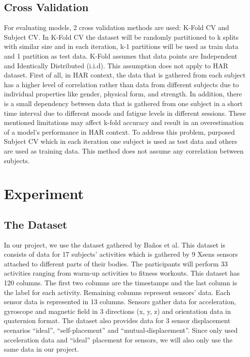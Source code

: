\documentclass[12pt, a4paper]{article}
\begin{document}
\subsection{Cross Validation}
For evaluating models, 2 cross validation methods are used: K-Fold CV and Subject CV. In K-Fold CV the dataset will be randomly partitioned to k splits with similar size and in each iteration, k-1 partitions will be used as train data and 1 partition as test data. K-Fold assumes that data points are Independent and Identically Distributed (i.i.d). This assumption does not apply to HAR dataset. First of all, in HAR context, the data that is gathered from each subject has a higher level of correlation rather than data from different subjects due to individual properties like gender, physical form, and strength. In addition, there is a small dependency between data that is gathered from one subject in a short time interval due to different moods and fatigue levels in different sessions.
These mentioned limitations may affect k-fold accuracy and result in an overestimation of a model's performance in HAR context. To address this problem, \cite{dehghani}  purposed Subject CV which in each iteration one subject is used as test data and others are used as training data. This method does not assume any correlation between subjects.

\section{Experiment}

\subsection{The Dataset}
In our project, we use the dataset gathered by Baños et al. \cite{dataset} This dataset is consists of data for 17 subjects’ activities which is gathered by 9 Xsens sensors attached to different parts of their bodies. The participants will perform 33 activities ranging from warm-up activities to fitness workouts. This dataset has 120 columns. The first two columns are the timestamps and the last column is the label for each activity. Remaining columns represent sensors’ data. Each sensor data is represented in 13 columns. Sensors gather data for acceleration, gyroscope and magnetic field in 3 directions (x, y, z) and orientation data in quaternion format.\cite{dataset} The dataset also provides data for 3 sensor displacement scenarios “ideal”, “self-placement” and “mutual-displacement”. Since \cite{dehghani}  only used acceleration data and “ideal” placement for sensors, we will also only use the same data in our project.
\end{document}
